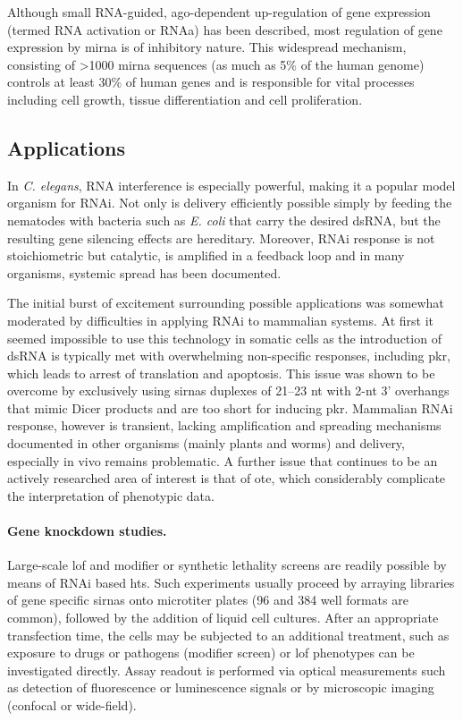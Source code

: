 Although small RNA-guided, \gls{ago}-dependent up-regulation of gene expression (termed RNA activation or RNAa) has been described, most regulation of gene expression by \gls{mirna} is of inhibitory nature. This widespread mechanism, consisting of \textgreater 1000 \gls{mirna} sequences (as much as 5\% of the human genome) controls at least 30\% of human genes and is responsible for vital processes including cell growth, tissue differentiation and cell proliferation.

\subsection{Applications}
In \textit{C. elegans}, RNA interference is especially powerful, making it a popular model organism for RNAi. Not only is delivery efficiently possible simply by feeding the nematodes with bacteria such as \textit{E. coli} that carry the desired dsRNA, but the resulting gene silencing effects are hereditary. Moreover, RNAi response is not stoichiometric but catalytic, is amplified in a feedback loop and in many organisms, systemic spread has been documented.

The initial burst of excitement surrounding possible applications was somewhat moderated by difficulties in applying RNAi to mammalian systems. At first it seemed impossible to use this technology in somatic cells as the introduction of dsRNA is typically met with overwhelming non-specific responses, including  \gls{pkr}, which leads to arrest of translation and apoptosis. This issue was shown to be overcome by exclusively using \glspl{sirna} duplexes of 21--23 nt with 2-nt 3' overhangs that mimic Dicer products and are too short for inducing \gls{pkr}. Mammalian RNAi response, however is transient, lacking amplification and spreading mechanisms documented in other organisms (mainly plants and worms) and delivery, especially in vivo remains problematic. A further issue that continues to be an actively researched area of interest is that of \gls{ote}, which considerably complicate the interpretation of phenotypic data.

\paragraph{Gene knockdown studies.}
Large-scale \gls{lof} and modifier or synthetic lethality screens are readily possible by means of RNAi based \gls{hts}. Such experiments usually proceed by arraying libraries of gene specific \glspl{sirna} onto microtiter plates (96 and 384 well formats are common), followed by the addition of liquid cell cultures. After an appropriate transfection time, the cells may be subjected to an additional treatment, such as exposure to drugs or pathogens (modifier screen) or \gls{lof} phenotypes can be investigated directly. Assay readout is performed via optical measurements such as detection of fluorescence or luminescence signals or by microscopic imaging (confocal or wide-field).

